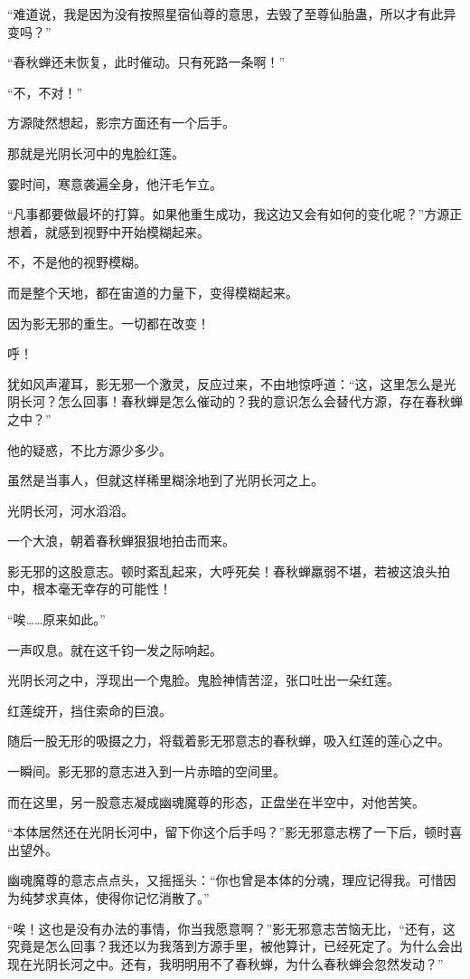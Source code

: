 \begin{this_body}
“难道说，我是因为没有按照星宿仙尊的意思，去毁了至尊仙胎蛊，所以才有此异变吗？”

“春秋蝉还未恢复，此时催动。只有死路一条啊！”

“不，不对！”

方源陡然想起，影宗方面还有一个后手。

那就是光阴长河中的鬼脸红莲。

霎时间，寒意袭遍全身，他汗毛乍立。

“凡事都要做最坏的打算。如果他重生成功，我这边又会有如何的变化呢？”方源正想着，就感到视野中开始模糊起来。

不，不是他的视野模糊。

而是整个天地，都在宙道的力量下，变得模糊起来。

因为影无邪的重生。一切都在改变！

呼！

犹如风声灌耳，影无邪一个激灵，反应过来，不由地惊呼道：“这，这里怎么是光阴长河？怎么回事！春秋蝉是怎么催动的？我的意识怎么会替代方源，存在春秋蝉之中？”

他的疑惑，不比方源少多少。

虽然是当事人，但就这样稀里糊涂地到了光阴长河之上。

光阴长河，河水滔滔。

一个大浪，朝着春秋蝉狠狠地拍击而来。

影无邪的这股意志。顿时紊乱起来，大呼死矣！春秋蝉羸弱不堪，若被这浪头拍中，根本毫无幸存的可能性！

“唉……原来如此。”

一声叹息。就在这千钧一发之际响起。

光阴长河之中，浮现出一个鬼脸。鬼脸神情苦涩，张口吐出一朵红莲。

红莲绽开，挡住索命的巨浪。

随后一股无形的吸摄之力，将载着影无邪意志的春秋蝉，吸入红莲的莲心之中。

一瞬间。影无邪的意志进入到一片赤暗的空间里。

而在这里，另一股意志凝成幽魂魔尊的形态，正盘坐在半空中，对他苦笑。

“本体居然还在光阴长河中，留下你这个后手吗？”影无邪意志楞了一下后，顿时喜出望外。

幽魂魔尊的意志点点头，又摇摇头：“你也曾是本体的分魂，理应记得我。可惜因为纯梦求真体，使得你记忆消散了。”

“唉！这也是没有办法的事情，你当我愿意啊？”影无邪意志苦恼无比，“还有，这究竟是怎么回事？我还以为我落到方源手里，被他算计，已经死定了。为什么会出现在光阴长河之中。还有，我明明用不了春秋蝉，为什么春秋蝉会忽然发动？”


\end{this_body}
